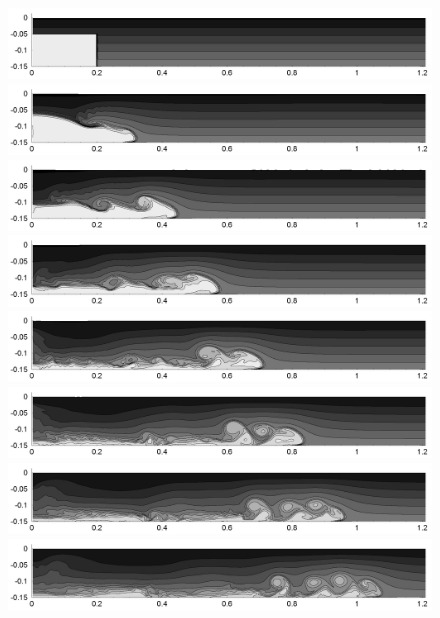 \begin{figure}[htbp]
  \begin{center}    \includegraphics[scale=0.55]{../figures/Staggered/Fig9case/060518c-SSPRK35-dt-001875-280-120/01.png}    \includegraphics[scale=0.55]{../figures/Staggered/Fig9case/060518c-SSPRK35-dt-001875-280-120/02.png}
\includegraphics[scale=0.55]{../figures/Staggered/Fig9case/060518c-SSPRK35-dt-001875-280-120/03.png}
\includegraphics[scale=0.55]{../figures/Staggered/Fig9case/060518c-SSPRK35-dt-001875-280-120/04.png}    \includegraphics[scale=0.55]{../figures/Staggered/Fig9case/060518c-SSPRK35-dt-001875-280-120/05.png}
\includegraphics[scale=0.55]{../figures/Staggered/Fig9case/060518c-SSPRK35-dt-001875-280-120/06.png}
\includegraphics[scale=0.55]{../figures/Staggered/Fig9case/060518c-SSPRK35-dt-001875-280-120/07.png}    \includegraphics[scale=0.55]{../figures/Staggered/Fig9case/060518c-SSPRK35-dt-001875-280-120/08.png}

\end{center}
\end{figure}
